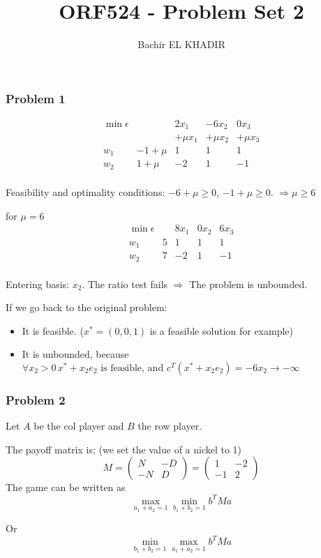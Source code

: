 \documentclass[12pt]{article}
\title{ORF524 - Problem Set 2}
\author{Bachir EL KHADIR }
\newcommand{\Q}[1]{\subsubsection*{Problem #1}}
\begin{document}
\maketitle

\Q{1}

\[
\begin{array}{l|r|r|r|r}
\min \epsilon &    & 2 x_1 & -6 x_2 & 0x_3\\
         &    &    +\mu x_1 &  +\mu x_2 & +\mu x_3\\
\hline
w_1      & -1+\mu & 1 & 1 & 1\\
w_2      &  1+\mu & -2 & 1 & -1\\
\end{array}
\]

Feasibility and optimality conditions:
$ -6 + \mu \geq 0$,
$ -1 + \mu \geq 0$. $\Rightarrow \mu \geq 6$ 

for $\mu = 6$
\[
\begin{array}{l|r|r|r|r}
\min \epsilon &    & 8 x_1 & 0 x_2 & 6 x_3\\
\hline
w_1      & 5 & 1 & 1 & 1\\
w_2      & 7 & -2 & 1 & -1\\
\end{array}
\]

Entering basis: $x_2$. The ratio test fails $\Rightarrow$ The problem is unbounded.

If we go back to the original problem: 
\begin{itemize}
\item It is feasible. ($x^* = (0, 0, 1)$ is a feasible solution for example)
\item It is unbounded, because $\forall x_2 > 0 \,  x^*+x_2 e_2 \text{ is feasible, and }  c^T(x^*+x_2 e_2) = -6 x_2 \rightarrow -\infty$
\end{itemize}


\Q{2}
Let $A$ be the col player and $B$ the row player.

The payoff matrix is: (we set the value of a nickel to 1)
\[ M = \left(\begin{array}{cc}N&-D\\-N&D \end{array} \right)
= \left(\begin{array}{cc}1&-2\\-1&2 \end{array} \right)
 \]
The game can be written as $$\max_{a_1 + a_2 = 1} \min_{b_1 + b_2 = 1} b^T M a $$

Or $$ \min_{b_1 + b_2 = 1} \max_{a_1 + a_2 = 1} b^T M a $$
\end{document}
